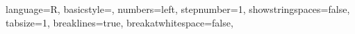 \newcommand{\smat}[1]{\brac{\begin{smallmatrix} #1 \end{smallmatrix}}}

\newcommand{\bmat}[1]{\begin{bmatrix} #1 \end{bmatrix}}

\newcommand{\pmat}[1]{\begin{pmatrix} #1 \end{pmatrix}}

\newcommand\numberthis{\addtocounter{equation}{1}\tag{\theequation}}

\newcommand{\eeq}[2][]{\begin{equation} \label{Eq:#1} #2 \end{equation}}

\newcommand{\eqq}[2][]{\begin{equation*} #2 \end{equation*}}


\usepackage{listings} %
\lstset
{ %
    language=R,
    basicstyle=\footnotesize,
    numbers=left,
    stepnumber=1,
    showstringspaces=false,
    tabsize=1,
    breaklines=true,
    breakatwhitespace=false,
}

\def\bma{\begin{pmatrix}}
\def\ema{\end{pmatrix}}

\usepackage{graphicx}

\setcounter{tocdepth}{5}
\setcounter{secnumdepth}{5}

